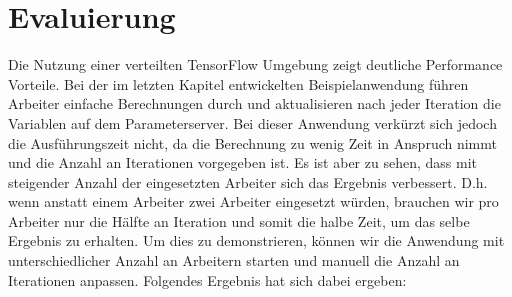 \section{Evaluierung}
Die Nutzung einer verteilten TensorFlow Umgebung zeigt deutliche Performance Vorteile. Bei der im letzten Kapitel entwickelten Beispielanwendung führen Arbeiter einfache Berechnungen durch und aktualisieren nach jeder Iteration die Variablen auf dem Parameterserver. Bei dieser Anwendung verkürzt sich jedoch die Ausführungszeit nicht, da die Berechnung zu wenig Zeit in Anspruch nimmt und die Anzahl an Iterationen vorgegeben ist. Es ist aber zu sehen, dass mit steigender Anzahl der eingesetzten Arbeiter sich das Ergebnis verbessert. D.h. wenn anstatt einem Arbeiter zwei Arbeiter eingesetzt würden, brauchen wir pro Arbeiter nur die Hälfte an Iteration und somit die halbe Zeit, um das selbe Ergebnis zu erhalten. Um dies zu demonstrieren, können wir die Anwendung mit  unterschiedlicher Anzahl an Arbeitern starten und manuell die Anzahl an Iterationen anpassen. Folgendes Ergebnis hat sich dabei ergeben:

